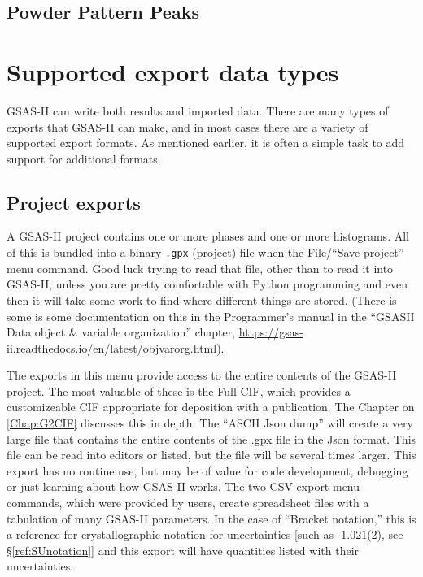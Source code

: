 \subsection{Powder Pattern Peaks}

\section{Supported export data types}
GSAS-II can write both results and imported data. There are many types of exports that GSAS-II can make, and in most cases there are a variety of supported export formats. As mentioned earlier, it is often a simple task to add support for additional formats.
\subsection{Project exports}
A GSAS-II project contains one or more phases and one or more histograms. All of this is bundled into a binary \texttt{.gpx} (project) file when the File/``Save project'' menu command. 
Good luck trying to read that file, other than to read it into GSAS-II, unless you are pretty comfortable with Python programming and even then it will take some work to find where different things are stored. (There is some is some documentation on this in the Programmer's manual in the ``GSASII Data object \& variable organization'' chapter, \url{https://gsas-ii.readthedocs.io/en/latest/objvarorg.html}). 

The exports in this menu provide access to the entire contents of the GSAS-II project. The most valuable of these is the Full CIF, which provides a customizeable CIF appropriate for deposition with a publication. The Chapter on \ref{Chap:G2CIF}  discusses this in depth. 
The ``ASCII Json dump'' will create a very large file that contains the entire contents of the .gpx file in the Json format. This file can be read into editors or listed, but the file will be several times larger. This export has no routine use, but may be of value for code development, debugging or just learning about how GSAS-II works. 
The two CSV export menu commands, which were provided by users, create spreadsheet files with a tabulation of many GSAS-II parameters. In the case of ``Bracket notation,'' this is a reference for crystallographic notation for uncertainties [such as -1.021(2), see \S\ref{ref:SUnotation}] and this export will have quantities listed with their uncertainties. 

